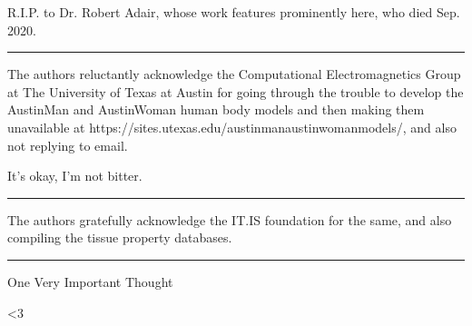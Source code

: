 \documentclass[paper.tex]{subfiles}
\begin{document}
R.I.P. to Dr. Robert Adair, whose work features prominently here, who died Sep. 2020. 


\rule{\linewidth}{0.2pt}

The authors reluctantly acknowledge the Computational Electromagnetics Group at The University of Texas at Austin for going through the trouble to develop the AustinMan and AustinWoman human body models and then making them unavailable at https://sites.utexas.edu/austinmanaustinwomanmodels/, and also not replying to email. 

It's okay, I'm not bitter.

\rule{\linewidth}{0.2pt}

The authors gratefully acknowledge the IT.IS foundation for the same, and also compiling the tissue property databases.

\rule{\linewidth}{0.2pt}

One Very Important Thought


{\Large {\verbatim <3}}
\end{document}

